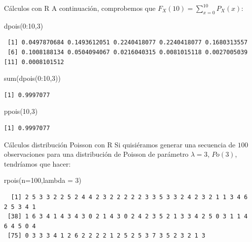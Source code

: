 \documentclass[
  ignorenonframetext,
  aspectratio=169]{beamer}
\newenvironment{Shaded}{\begin{snugshade}}{\end{snugshade}}
\newcommand{\AttributeTok}[1]{\textcolor[rgb]{0.40,0.45,0.13}{#1}}
\newcommand{\DecValTok}[1]{\textcolor[rgb]{0.68,0.00,0.00}{#1}}
\newcommand{\FunctionTok}[1]{\textcolor[rgb]{0.28,0.35,0.67}{#1}}
\newcommand{\NormalTok}[1]{\textcolor[rgb]{0.00,0.23,0.31}{#1}}
\newcommand{\SpecialCharTok}[1]{\textcolor[rgb]{0.37,0.37,0.37}{#1}}
\begin{document}
\begin{frame}[fragile]{Cálculos con R}
\protect\hypertarget{cuxe1lculos-con-r-6}{}
A continuación, comprobemos que
\(F_X(10)=\sum\limits_{x=0}^{10} P_X(x)\):

\begin{Shaded}
\begin{Highlighting}[]
\FunctionTok{dpois}\NormalTok{(}\DecValTok{0}\SpecialCharTok{:}\DecValTok{10}\NormalTok{,}\DecValTok{3}\NormalTok{)}
\end{Highlighting}
\end{Shaded}

\begin{verbatim}
 [1] 0.0497870684 0.1493612051 0.2240418077 0.2240418077 0.1680313557
 [6] 0.1008188134 0.0504094067 0.0216040315 0.0081015118 0.0027005039
[11] 0.0008101512
\end{verbatim}

\begin{Shaded}
\begin{Highlighting}[]
\FunctionTok{sum}\NormalTok{(}\FunctionTok{dpois}\NormalTok{(}\DecValTok{0}\SpecialCharTok{:}\DecValTok{10}\NormalTok{,}\DecValTok{3}\NormalTok{))}
\end{Highlighting}
\end{Shaded}

\begin{verbatim}
[1] 0.9997077
\end{verbatim}

\begin{Shaded}
\begin{Highlighting}[]
\FunctionTok{ppois}\NormalTok{(}\DecValTok{10}\NormalTok{,}\DecValTok{3}\NormalTok{)}
\end{Highlighting}
\end{Shaded}

\begin{verbatim}
[1] 0.9997077
\end{verbatim}
\end{frame}

\begin{frame}[fragile]{Cálculos distribución Poisson con R}
\protect\hypertarget{cuxe1lculos-distribuciuxf3n-poisson-con-r}{}
Si quisiéramos generar una secuencia de \(100\) observaciones para una
distribución de Poisson de parámetro \(\lambda=3\), \(Po(3)\),
tendríamos que hacer:

\begin{Shaded}
\begin{Highlighting}[]
\FunctionTok{rpois}\NormalTok{(}\AttributeTok{n=}\DecValTok{100}\NormalTok{,}\AttributeTok{lambda =} \DecValTok{3}\NormalTok{)}
\end{Highlighting}
\end{Shaded}

\begin{verbatim}
  [1] 2 5 3 3 2 2 5 2 4 4 2 3 2 2 2 2 2 3 3 5 3 3 2 4 2 3 2 1 1 3 4 6 2 5 3 4 1
 [38] 1 6 3 4 1 4 3 4 3 0 2 1 4 3 0 2 4 2 3 5 2 1 3 3 4 2 5 0 3 1 1 4 6 4 5 0 4
 [75] 0 3 3 3 4 1 2 6 2 2 2 2 1 2 5 2 5 3 7 3 5 2 3 2 1 3
\end{verbatim}
\end{frame}
\end{document}
